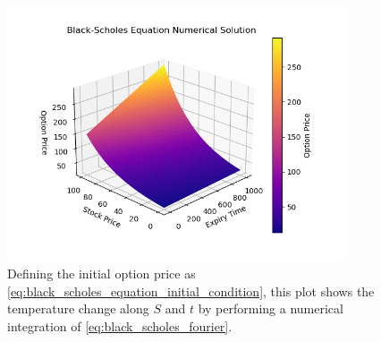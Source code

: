 \begin{figure}[H]
    \centering
    \includegraphics[width=100mm,height=\textheight,keepaspectratio]{images/black_scholes_equation_numerical.png}
    \caption{Defining the initial option price as \cref{eq:black_scholes_equation_initial_condition}, this plot shows the temperature change along \(S\) and \(t\) by performing a numerical integration of \cref{eq:black_scholes_fourier}.}
    \label{fig:black_scholes_equation_numerical}
\end{figure}